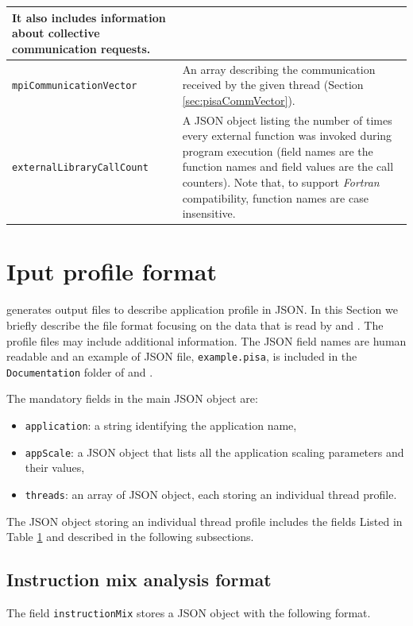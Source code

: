 \documentclass[a4paper, 10pt]{article}
\begin{document}
\begin{table}[t!]
\begin{tabular}{|p{3cm} ||p{8.2cm}| }
   It also includes information about collective communication requests. \\
   \hline
   \texttt{mpiCommunicationVector} & An array describing the communication received
	by the given thread (Section \ref{sec:pisaCommVector}). \\
   \hline
   \texttt{externalLibraryCallCount} & A JSON object listing the number of times every external
	function was invoked during program execution (field names are the function
	names and field values are the call counters). Note that, to support \textit{Fortran} compatibility,
	function names are case insensitive. \\
  \hline
\end{tabular}
\label{tab:pisaThreadFields}
  \end{table}


\section{Iput profile format}
\label{apx:pisaFormat}

\pisa generates output files to describe application profile in JSON.
In this Section we briefly describe the file format focusing on the data that is read by \ex and \eb.
The profile files may include additional information. The JSON field names are human readable and an example of JSON
file, \texttt{example.pisa}, is included in the \texttt{Documentation} folder of \ex and \eb.

The mandatory fields in the main JSON object are:
\begin{itemize}
 \item \texttt{application}: a string identifying the application name,
 \item \texttt{appScale}: a JSON object that lists all the application scaling parameters and their values,
 \item \texttt{threads}: an array of JSON object, each storing an individual thread profile.
\end{itemize}

The JSON object storing an individual thread profile includes the fields Listed in Table \ref{tab:pisaThreadFields}
and described in the following subsections.



\subsection{Instruction mix analysis format}
\label{sec:pisaImix}
The field \texttt{instructionMix} stores a JSON object with the following format.
\end{document}
